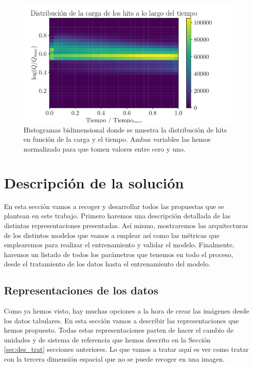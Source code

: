 \documentclass[a4paper,12pt,twoside,titlepage]{article}
\begin{document}
\begin{figure}[h!]
  \centering
  \includegraphics[scale=0.85]{hist_charge_time.pdf}
  \caption{Histogramas bidimensional donde se muestra la distribución de hits en función de la carga y el tiempo. Ambas variables las hemos normalizado para que tomen valores entre cero y uno.}
  \label{fig:hist_charge_t}
\end{figure}


\section{Descripción de la solución}
\label{sec:arch}

En esta sección vamos a recoger y desarrollar todos las propuestas que se plantean en este trabajo. Primero haremos una descripción detallada de las distintas representaciones presentadas. Así mismo, mostraremos las arquitecturas de los distintos modelos que vamos a emplear así como las métricas que emplearemos para realizar el entrenamiento y validar el modelo. Finalmente, haremos un listado de todos los parámetros que tenemos en todo el proceso, desde el tratamiento de los datos hasta el entrenamiento del modelo.

\subsection{Representaciones de los datos}

Como ya hemos visto, hay muchas opciones a la hora de crear las imágenes desde los datos tabulares. En esta sección vamos a describir las representaciones que hemos propuesto. Todas estas representaciones parten de hacer el cambio de unidades y de sistema de referencia que hemos descrito en la Sección \ref{sec:des_trat} secciones anteriores. Lo que vamos a tratar aquí es ver como tratar con la tercera dimensión espacial que no se puede recoger en una imagen. 
\end{document}

